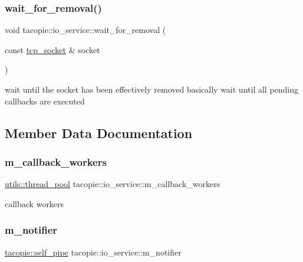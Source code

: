 \subsubsection{\texorpdfstring{wait\+\_\+for\+\_\+removal()}{wait\_for\_removal()}}
{\footnotesize\ttfamily void tacopie\+::io\+\_\+service\+::wait\+\_\+for\+\_\+removal (\begin{DoxyParamCaption}\item[{const \hyperlink{classtacopie_1_1tcp__socket}{tcp\+\_\+socket} \&}]{socket }\end{DoxyParamCaption})}

wait until the socket has been effectively removed basically wait until all pending callbacks are executed 

\subsection{Member Data Documentation}
\mbox{\label{classtacopie_1_1io__service_ace8ecb6c752a0adb3b2fec1c92cf1161}} 
\subsubsection{\texorpdfstring{m\+\_\+callback\+\_\+workers}{m\_callback\_workers}}
{\footnotesize\ttfamily \hyperlink{classtacopie_1_1utils_1_1thread__pool}{utils\+::thread\+\_\+pool} tacopie\+::io\+\_\+service\+::m\+\_\+callback\+\_\+workers\hspace{0.3cm}{\ttfamily [private]}}

callback workers \mbox{\label{classtacopie_1_1io__service_ae8a17523ba4719b0e799d1c5d665e69f}} 
\subsubsection{\texorpdfstring{m\+\_\+notifier}{m\_notifier}}
{\footnotesize\ttfamily \hyperlink{classtacopie_1_1self__pipe}{tacopie\+::self\+\_\+pipe} tacopie\+::io\+\_\+service\+::m\+\_\+notifier\hspace{0.3cm}{\ttfamily [private]}}

